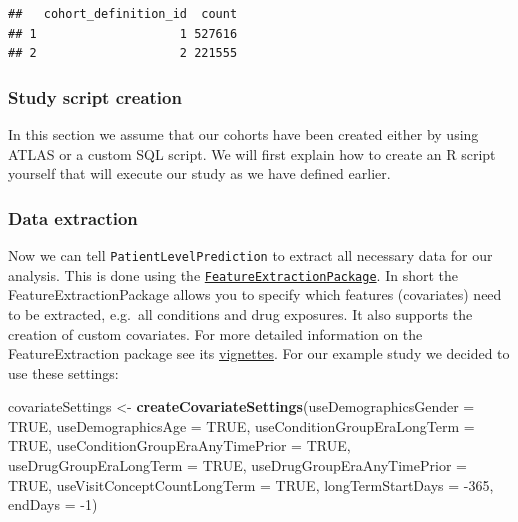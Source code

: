 \documentclass[
]{article}
\newenvironment{Shaded}{\begin{snugshade}}{\end{snugshade}}
\newcommand{\DataTypeTok}[1]{\textcolor[rgb]{0.13,0.29,0.53}{#1}}
\newcommand{\DecValTok}[1]{\textcolor[rgb]{0.00,0.00,0.81}{#1}}
\newcommand{\KeywordTok}[1]{\textcolor[rgb]{0.13,0.29,0.53}{\textbf{#1}}}
\newcommand{\NormalTok}[1]{#1}
\newcommand{\OtherTok}[1]{\textcolor[rgb]{0.56,0.35,0.01}{#1}}
\newcommand{\StringTok}[1]{\textcolor[rgb]{0.31,0.60,0.02}{#1}}
\begin{document}
\begin{verbatim}
##   cohort_definition_id  count
## 1                    1 527616
## 2                    2 221555
\end{verbatim}

\hypertarget{study-script-creation}{%
\subsubsection{Study script creation}\label{study-script-creation}}

In this section we assume that our cohorts have been created either by
using ATLAS or a custom SQL script. We will first explain how to create
an R script yourself that will execute our study as we have defined
earlier.

\hypertarget{data-extraction}{%
\subsubsection{Data extraction}\label{data-extraction}}

Now we can tell \texttt{PatientLevelPrediction} to extract all necessary
data for our analysis. This is done using the
\href{https://github.com/OHDSI/FeatureExtration}{\texttt{FeatureExtractionPackage}}.
In short the FeatureExtractionPackage allows you to specify which
features (covariates) need to be extracted, e.g.~all conditions and drug
exposures. It also supports the creation of custom covariates. For more
detailed information on the FeatureExtraction package see its
\href{https://github.com/OHDSI/FeatureExtration}{vignettes}. For our
example study we decided to use these settings:

\begin{Shaded}
\begin{Highlighting}[]
\NormalTok{  covariateSettings <-}\StringTok{ }\KeywordTok{createCovariateSettings}\NormalTok{(}\DataTypeTok{useDemographicsGender =} \OtherTok{TRUE}\NormalTok{,}
  \DataTypeTok{useDemographicsAge =} \OtherTok{TRUE}\NormalTok{,}
  \DataTypeTok{useConditionGroupEraLongTerm =} \OtherTok{TRUE}\NormalTok{,}
  \DataTypeTok{useConditionGroupEraAnyTimePrior =} \OtherTok{TRUE}\NormalTok{,}
  \DataTypeTok{useDrugGroupEraLongTerm =} \OtherTok{TRUE}\NormalTok{,}
  \DataTypeTok{useDrugGroupEraAnyTimePrior =} \OtherTok{TRUE}\NormalTok{,}
  \DataTypeTok{useVisitConceptCountLongTerm =} \OtherTok{TRUE}\NormalTok{,}
  \DataTypeTok{longTermStartDays =} \DecValTok{-365}\NormalTok{,}
  \DataTypeTok{endDays =} \DecValTok{-1}\NormalTok{)}
\end{Highlighting}
\end{Shaded}
\end{document}
